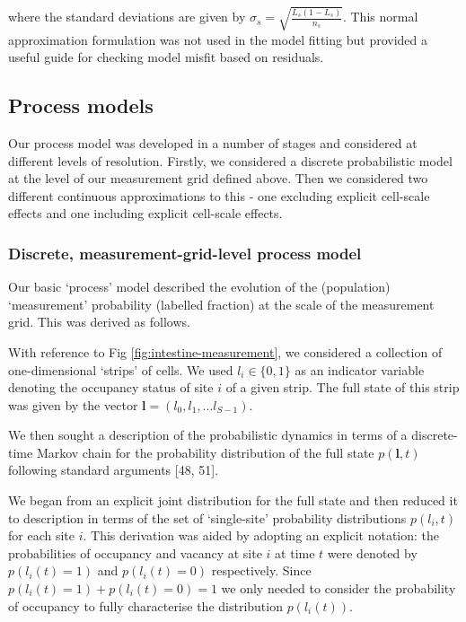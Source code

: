 \documentclass[10pt,letterpaper]{article}
\begin{document}
where the standard deviations are given by
\(\sigma_s = \sqrt{\frac{L_s(1-L_s)}{n_s}}\). This normal approximation
formulation was not used in the model fitting but provided a useful
guide for checking model misfit based on residuals.

\subsection{Process models}\label{process-models}

Our process model was developed in a number of stages and considered at
different levels of resolution. Firstly, we considered a discrete
probabilistic model at the level of our measurement grid defined above.
Then we considered two different continuous approximations to this - one
excluding explicit cell-scale effects and one including explicit
cell-scale effects.

\subsubsection{Discrete, measurement-grid-level process
model}\label{discrete-measurement-grid-level-process-model}

Our basic `process' model described the evolution of the (population)
`measurement' probability (labelled fraction) at the scale of the
measurement grid. This was derived as follows.

With reference to Fig \ref{fig:intestine-measurement}, we considered a
collection of one-dimensional `strips' of cells. We used
\(l_i \in \{0,1\}\) as an indicator variable denoting the occupancy
status of site \(i\) of a given strip. The full state of this strip was
given by the vector \(\mathbf{l} = (l_0,l_1,...l_{S-1})\).

We then sought a description of the probabilistic dynamics in terms of a
discrete-time Markov chain for the probability distribution of the full
state \(p(\mathbf{l},t)\) following standard arguments {[}48, 51{]}.

We began from an explicit joint distribution for the full state and then
reduced it to description in terms of the set of `single-site'
probability distributions \(p(l_i,t)\) for each site \(i\). This
derivation was aided by adopting an explicit notation: the probabilities
of occupancy and vacancy at site \(i\) at time \(t\) were denoted by
\(p(l_i(t)=1)\) and \(p(l_i(t)=0)\) respectively. Since
\(p(l_i(t)=1)+ p(l_i(t)=0) = 1\) we only needed to consider the
probability of occupancy to fully characterise the distribution
\(p(l_i(t))\).
\end{document}
